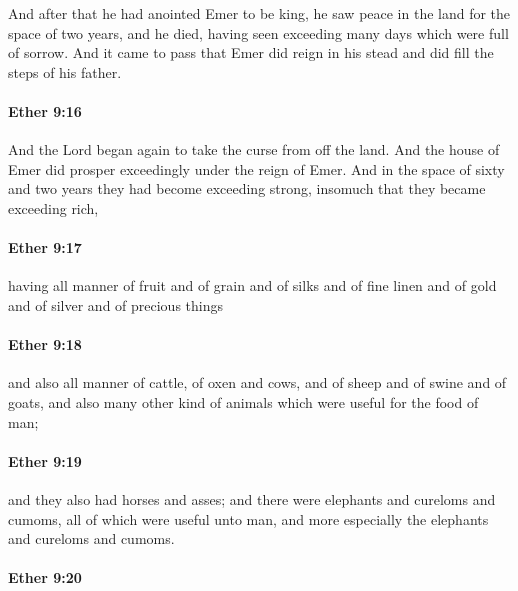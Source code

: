 			And after that he had anointed Emer to be king,
			he saw peace in the land for the space of two years, and he died,
			having seen exceeding many days which were full of sorrow.
			And it came to pass that Emer did reign in his stead
			and did fill the steps of his father.

		\paragraph{Ether 9:16} %
			\label{ETHER-9-16}

			And the Lord began again to take the curse from off the land.
			And the house of Emer did prosper exceedingly under the reign of Emer.
			And in the space of sixty and two years they had become exceeding strong,
			insomuch that they became exceeding rich,

		\paragraph{Ether 9:17} %
			\label{ETHER-9-17}

			having all manner of fruit and of grain
			and of silks and of fine linen
			and of gold and of silver and of precious things

		\paragraph{Ether 9:18} %
			\label{ETHER-9-18}

			and also all manner of cattle, of oxen and cows,
			and of sheep and of swine and of goats,
			and also many other kind of animals which were useful for the food of man;

		\paragraph{Ether 9:19} %
			\label{ETHER-9-19}

			and they also had horses and asses;
			and there were elephants and cureloms and cumoms,
			all of which were useful unto man,
			and more especially the elephants and cureloms and cumoms.

		\paragraph{Ether 9:20} %
			\label{ETHER-9-20}

